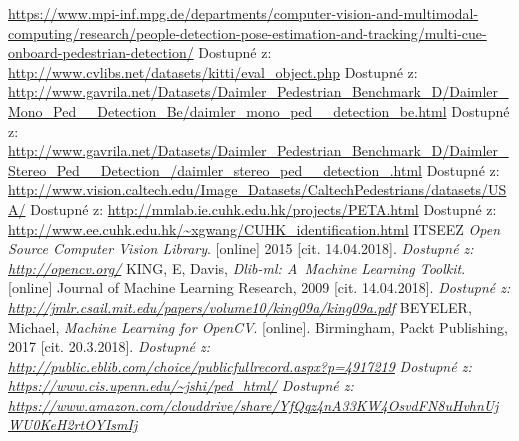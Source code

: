 \begin{thebibliography}{99}
		\url{https://www.mpi-inf.mpg.de/departments/computer-vision-and-multimodal-computing/research/people-detection-pose-estimation-and-tracking/multi-cue-onboard-pedestrian-detection/}
 	 Dostupné z: \url{http://www.cvlibs.net/datasets/kitti/eval_object.php}
 	 Dostupné z: \url{http://www.gavrila.net/Datasets/Daimler_Pedestrian_Benchmark_D/Daimler_Mono_Ped__Detection_Be/daimler_mono_ped__detection_be.html}
 	 Dostupné z: \url{http://www.gavrila.net/Datasets/Daimler_Pedestrian_Benchmark_D/Daimler_Stereo_Ped__Detection_/daimler_stereo_ped__detection_.html}
 	 Dostupné z: \url{http://www.vision.caltech.edu/Image_Datasets/CaltechPedestrians/datasets/USA/}
 	 Dostupné z: \url{http://mmlab.ie.cuhk.edu.hk/projects/PETA.html}
 	 Dostupné z: \url{http://www.ee.cuhk.edu.hk/~xgwang/CUHK_identification.html}
 	 ITSEEZ \textit{Open Source Computer Vision Library}. [online] 2015 [cit. 14.04.2018].
 			\textit{Dostupné z: \url{http://opencv.org/}}
 	 KING, E, Davis,  \textit{Dlib-ml: A~Machine Learning Toolkit}. [online] Journal of Machine Learning Research,  2009 [cit. 14.04.2018].
 			\textit{Dostupné z: \url{http://jmlr.csail.mit.edu/papers/volume10/king09a/king09a.pdf}}
 	 BEYELER, Michael, \textit{Machine Learning for OpenCV}. [online].  Birmingham, Packt Publishing, 2017 [cit. 20.3.2018].
			\textit{ Dostupné z: \url{http://public.eblib.com/choice/publicfullrecord.aspx?p=4917219}}
 	 \textit{Dostupné z: \url{https://www.cis.upenn.edu/~jshi/ped_html/}}
 	 \textit{Dostupné z: \url{https://www.amazon.com/clouddrive/share/YfQqz4nA33KW4OsvdFN8uHvhnUjWU0KeH2rtOYIsmIj}}
\end{thebibliography}
